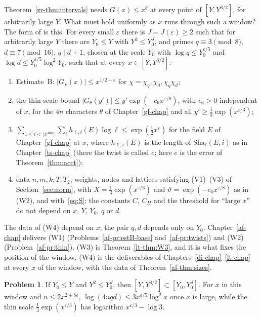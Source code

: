 \documentclass[reqno]{amsart}
\newcounter{chap}
\theoremstyle{definition}
\newtheorem{problem}{Problem}[section]
\theoremstyle{plain}
\newcommand{\Sha}{\mathrm{Sha}}
\begin{document}
Theorem~\ref{zr-thm:intervals} needs \(G(x) \le x^\theta\) at every point of \([Y, Y^{3/2}]\), for arbitrarily large \(Y\).  What must hold uniformly as \(x\) runs through such a window?  The form of \cite[\S18]{Adr} is this.  For every small \(\varepsilon\) there is \(J = J(\varepsilon) \ge 2\) such that for arbitrarily large \(Y\) there are \(Y_0 \le Y\) with \(Y^2 \le Y_0^J\), and primes \(q \equiv 3 \pmod 8\), \(d \equiv 7 \pmod{16}\), \(q \mid d + 1\), chosen at the scale \(Y_0\) with \(\log q \le Y_0^{\varepsilon/5}\) and \(\log d \le Y_0^{\varepsilon/5}\log^2Y_0\), such that at every \(x \in [Y, Y^{3/2}]\):
\begin{enumerate}
\item[(W1)] Estimate~B: \(\lvert G_\chi(x)\rvert \le x^{1/2+\varepsilon}\) for \(\chi = \chi_q, \chi_d, \chi_q\chi_d\);
\item[(W2)] the thin-scale bound \(\lvert G_\theta(y')\rvert \le y'\exp(-c_6x^{\varepsilon/8})\), with \(c_6 > 0\) independent of \(x\), for the \(4n\) characters \(\theta\) of Chapter~\ref{gf-chap} and all \(y' \ge \frac13\exp(x^{\varepsilon/3})\);
\item[(W3)] \(\sum_{1 \le i < \lfloor x^{400}\rfloor} \sum_\ell h_{\ell,i}(E)\log\ell \le \exp(\frac12x^\varepsilon)\) for the field \(E\) of Chapter~\ref{gf-chap} at \(x\), where \(h_{\ell,i}(E)\) is the length of \(\Sha_\ell(E,i)\) as in Chapter~\ref{ts-chap} (there the twist is called \(e\); here \(e\) is the error of Theorem~\ref{thm:acct});
\item[(W4)] data \(n, m, k, T, T_2\), weights, nodes and lattices satisfying (V1)--(V3) of Section~\ref{sec:norm}, with \(X = \frac13\exp(x^{\varepsilon/3})\) and \(\vartheta = \exp(-c_6x^{\varepsilon/8})\) as in (W2), and with~\eqref{eq:S}; the constants \(C\), \(C_H\) and the threshold for ``large \(x\)'' do not depend on \(x\), \(Y\), \(Y_0\), \(q\) or \(d\).
\end{enumerate}
The data of (W4) depend on \(x\); the pair \(q, d\) depends only on \(Y_0\).  Chapter~\ref{af-chap} delivers (W1) (Problems~\ref{af-pr:estB-base} and~\ref{af-pr:twists}) and (W2) (Problem~\ref{af-pr:thin}).  (W3) is Theorem~\ref{lt-thm:W3}, and it is what fixes the position of the window.  (W4) is the deliverables of Chapters~\ref{di-chap}--\ref{lt-chap} at every \(x\) of the window, with the data of Theorem~\ref{af-thm:sizes}.

\begin{problem}\label{pr:window}
If \(Y_0 \le Y\) and \(Y^2 \le Y_0^J\), then \([Y, Y^{3/2}] \subset [Y_0, Y_0^J]\).  For \(x\) in this window and \(n \le 2x^{2+8\varepsilon}\), \(\log(4nqd) \le 3x^{\varepsilon/5}\log^2x\) once \(x\) is large, while the thin scale \(\frac13\exp(x^{\varepsilon/3})\) has logarithm \(x^{\varepsilon/3} - \log 3\).
\end{problem}
\end{document}
